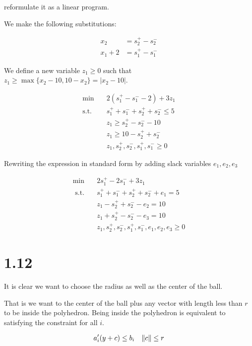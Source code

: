 \documentclass[12pt]{paper}
\newcommand{\abs}[1]{\left \lvert #1 \right \rvert}
\DeclarePairedDelimiter{\norm}{\lVert}{\rVert}
\begin{document}
reformulate it as a linear program.

\vspace{.3in}

We make the following substitutions:

\begin{align*}
 x_2 &= s_2^+ - s_2^-\\
x_1 + 2 &= s_1^+ - s_1^-
\end{align*}

We define a new variable $z_1 \geq 0$ such that $z_1 \ge \max\{x_2 -10, 10
-x_2 \} = \abs{x_2 - 10}$.


\begin{align*}
  \min \quad & 2(s_1^+ - s_1^- - 2) + 3z_1\\
  \text{s.t. } &s_1^+ + s_1^- + s_2^+ + s_2^- \leq 5\\
       &z_1 \geq s_2^+ - s_2^- - 10\\
       &z_1 \geq 10 - s_2^+ + s_2^-\\
       &z_1, s_2^+, s_2^-, s_1^+, s_1^- \geq 0
\end{align*}

Rewriting the expression in standard form by adding slack variables
$e_1, e_2, e_3$

\begin{align*}
  \min \quad & 2 s_1^+ - 2s_1^- + 3z_1\\
  \text{ s.t. } & s_1^+ + s_1^- + s_2^+ + s_2^- + e_1 = 5\\
       & z_1 - s_2^+ + s_2^- - e_2 = 10\\
       & z_1 + s_2^+ - s_2^- - e_3 = 10\\
       &z_1, s_2^+, s_2^-, s_1^+, s_1^-, e_1, e_2, e_3 \geq 0
\end{align*}

\section{1.12}

It is clear we want to choose the radius as well as the center of the
ball.

That is we want to the center of the ball plus any vector with length
less than $r$ to be inside the polyhedron. Being inside the polyhedron
is equivalent to satisfying the constraint for all $i$.

\begin{equation*}
  a_i' ( y + c) \leq b_i \quad \norm{c} \leq r
\end{equation*}
\end{document}
